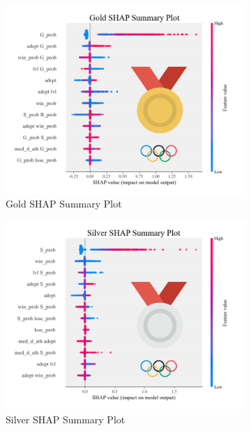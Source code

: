 \documentclass[12pt]{article}  %
\begin{document}
\begin{figure}[H]
	\centering
	\begin{subfigure}[b]{.32\textwidth}
		\includegraphics[width=\textwidth]{img/shap1.png}
		\caption{Gold SHAP Summary Plot}\label{subfig:1}
	\end{subfigure}
	\hfill 
	\begin{subfigure}[b]{.32\textwidth}
		\includegraphics[width=\textwidth]{img/shap2.png}
		\caption{Silver SHAP Summary Plot}\label{subfig:2}
	\end{subfigure}
	\hfill 
	\begin{subfigure}[b]{.32\textwidth}

\end{subfigure}
\end{figure}
\end{document}
